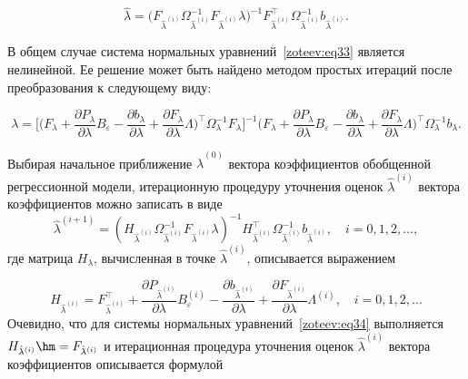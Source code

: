\begin{equation}
\hat{\lambda}=\big(F_{\hat{\lambda}^{(i)}}\Omega_{\hat{\lambda}^{(i)}}^{-1}F_{\hat{\lambda}^{(i)}}\lambda\big)^{-1}F_{\hat{\lambda}^{(i)}}^{\top}\Omega_{\hat{\lambda}^{(i)}}^{-1}b_{\hat{\lambda}^{(i)}}.
\label{zoteev:eq35}
\end{equation}

В общем случае система нормальных уравнений~\eqref{zoteev:eq33} является нелинейной. Ее решение может быть найдено методом простых итераций после преобразования к следующему виду:

\begin{equation}
\lambda=\Big[\Big(F_\lambda+\dfrac{\partial P_\lambda}{\partial \lambda}B_\varepsilon-\dfrac{\partial b_\lambda}{\partial \lambda}+\dfrac{\partial F_\lambda}{\partial \lambda}\Lambda\Big)^{\top}\Omega_\lambda^{-1}F_\lambda\Big]^{-1}\Big(F_\lambda+\dfrac{\partial P_\lambda}{\partial \lambda}B_\varepsilon-\dfrac{\partial b_\lambda}{\partial \lambda}+\dfrac{\partial F_\lambda}{\partial \lambda}\Lambda\Big)^{\top}\Omega_\lambda^{-1}b_\lambda.
\label{zoteev:eq36}
\end{equation}

Выбирая начальное приближение $\hat{\lambda}^{(0)}$ вектора коэффициентов обобщенной регрессионной модели, итерационную процедуру уточнения оценок $\hat{\lambda}^{(i)}$ вектора коэффициентов можно записать в виде
\begin{equation}
\hat{\lambda}^{(i+1)}=(H_{\hat{\lambda}^{(i)}}\Omega_{\hat{\lambda}^{(i)}}^{-1}F_{\hat{\lambda}^{(i)}}\lambda)^{-1}H_{\hat{\lambda}^{(i)}}^{\top}\Omega_{\hat{\lambda}^{(i)}}^{-1}b_{\hat{\lambda}^{(i)}}, \quad i=0,1,2,\dots,
\label{zoteev:eq37}
\end{equation}
где матрица $H_\lambda$, вычисленная в точке $\hat{\lambda}^{(i)}$, описывается выражением

\begin{equation}
H_{\hat{\lambda}^{(i)}}=F_{\hat{\lambda}^{(i)}}^{\top}+\dfrac{\partial P_{{\hat{\lambda}^{(i)}}}}{\partial \lambda}B^{(i)}_\varepsilon-\dfrac{\partial b_{{\hat{\lambda}^{(i)}}}}{\partial \lambda}+\dfrac{\partial F_{{\hat{\lambda}^{(i)}}}}{\partial \lambda}\Lambda^{(i)}, \quad i=0,1,2,\dots
\label{zoteev:eq38}
\end{equation}
Очевидно, что для системы нормальных уравнений~\eqref{zoteev:eq34} выполняется 
$H_{\hat{\lambda}^{(i)}}\hm =F_{\hat{\lambda}^{(i)}}$ и  итерационная процедура уточнения оценок $\hat{\lambda}^{(i)}$ вектора коэффициентов описывается формулой

